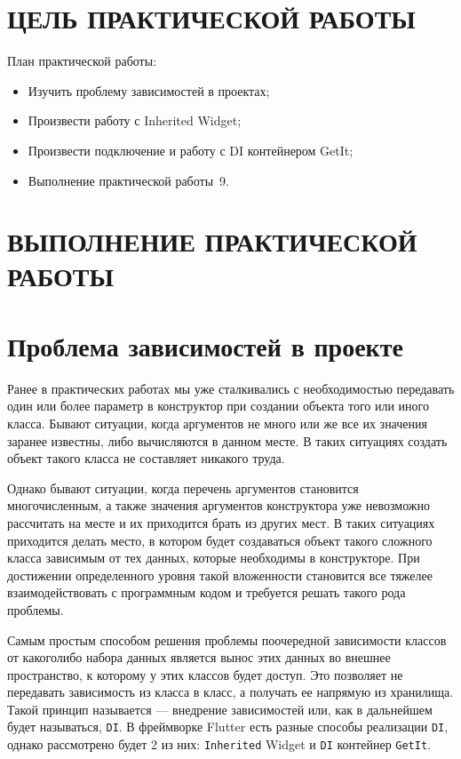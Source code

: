 \section*{ЦЕЛЬ ПРАКТИЧЕСКОЙ РАБОТЫ}

План практической работы:

\begin{itemize}
	\item Изучить проблему зависимостей в проектах;
	\item Произвести работу с Inherited Widget;
	\item Произвести подключение и работу с DI контейнером GetIt;
	\item Выполнение практической работы \No\,9.
\end{itemize}

\clearpage

\section*{ВЫПОЛНЕНИЕ ПРАКТИЧЕСКОЙ РАБОТЫ}

\section{Проблема зависимостей в проекте}

Ранее в практических работах мы уже сталкивались
с необходимостью передавать один
или более параметр в конструктор при создании объекта того или иного класса.
Бывают ситуации, когда аргументов не много
или же все их значения заранее известны,
либо вычисляются в данном месте.
В таких ситуациях создать объект такого класса
не составляет никакого труда.\par
Однако бывают ситуации, когда перечень аргументов становится многочисленным,
а также значения аргументов конструктора уже невозможно рассчитать на месте
и их приходится брать из других мест.
В таких ситуациях приходится делать место,
в котором будет создаваться объект такого сложного класса зависимым
от тех данных, которые необходимы в конструкторе.
При достижении определенного уровня такой вложенности становится все
тяжелее взаимодействовать с программным кодом
и требуется решать такого рода проблемы.\par
Самым простым способом решения проблемы поочередной зависимости классов
от какоголибо набора данных является вынос этих данных во внешнее пространство,
к которому у этих классов будет доступ.
Это позволяет не передавать зависимость из класса в класс,
а получать ее напрямую из хранилища.
Такой принцип называется --- внедрение зависимостей или,
как в дальнейшем будет называться, \texttt{DI}.
В фреймворке Flutter есть разные способы реализации \texttt{DI},
однако рассмотрено будет 2 из них:
\texttt{Inherited} Widget и \texttt{DI} контейнер \texttt{GetIt}.

